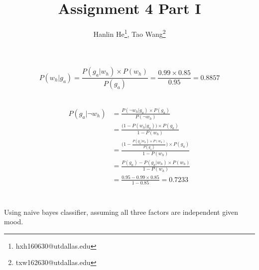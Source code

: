 \documentclass[12pt, letterpaper]{article}
\title{Assignment 4 Part I}
\author{Hanlin He\footnote{hxh160630@utdallas.edu},
Tao Wang\footnote{txw162630@utdallas.edu}}
\begin{document}
\maketitle

\section{}

\subsection{}
\[P(w_h|g_a)=\frac{P(g_a|w_h) \times P(w_h)}{P(g_a)}=\frac{0.99 \times 0.85}{0.95}=0.8857\]

\subsection{}
\begin{align*}
\begin{split}
P(g_a|\lnot w_h)
&=\frac{P(\lnot w_h|g_a) \times P(g_a)}{P(\lnot w_h)}\\
&=\frac{\big(1-P(w_h|g_a)\big) \times P(g_a)}{1-P(w_h)}\\
&=\frac{\Big(1-\frac{P(g_a|w_h) \times P(w_h)}{P(g_a)}\Big) \times P(g_a)}{1-P(w_h)}\\
&=\frac{P(g_a)-P(g_a|w_h) \times P(w_h)}{1-P(w_h)}\\
&=\frac{0.95-0.99\times0.85}{1-0.85}=0.7233
\end{split}
\end{align*}

\section{}

\section{}

\subsection{}

Using naive bayes classifier, assuming all three factors are independent given mood.
\end{document}
